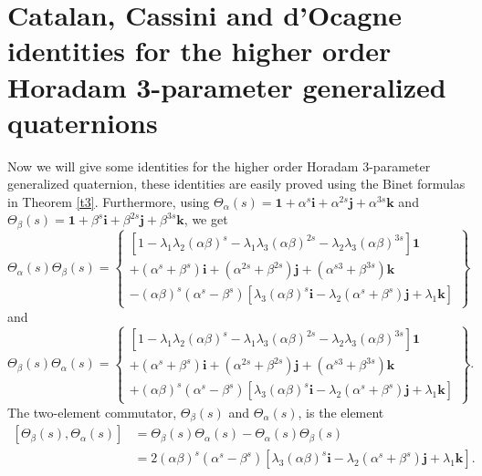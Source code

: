 \documentclass{kms-c}
\theoremstyle{plain}
\theoremstyle{definition}
\theoremstyle{remark}
\begin{document}
\section{Catalan, Cassini and d'Ocagne identities for the higher order Horadam 3-parameter generalized quaternions}
Now we will give some identities for the higher order Horadam 3-parameter generalized quaternion, these identities are easily proved using the Binet formulas in Theorem \ref{t3}. Furthermore, using $\Theta_{\alpha}(s)=\textbf{1}+\alpha^{s}\textbf{i}+\alpha^{2s}\textbf{j}+\alpha^{3s}\textbf{k}$ and $\Theta_{\beta}(s)=\textbf{1}+\beta^{s}\textbf{i}+\beta^{2s}\textbf{j}+\beta^{3s}\textbf{k}$, we get
\[
\Theta_{\alpha}(s)\Theta_{\beta}(s)=\left\lbrace \begin{array}{c}
\left[1-\lambda_{1}\lambda_{2}(\alpha\beta)^{s}-\lambda_{1}\lambda_{3}(\alpha\beta)^{2s}-\lambda_{2}\lambda_{3}(\alpha\beta)^{3s}\right]\textbf{1}\\
+(\alpha^{s}+\beta^{s})\textbf{i}+(\alpha^{2s}+\beta^{2s})\textbf{j}+(\alpha^{s3}+\beta^{3s})\textbf{k}\\
-(\alpha\beta)^{s}(\alpha^{s}-\beta^{s})\left[\lambda_{3}(\alpha\beta)^{s}\textbf{i}-\lambda_{2}(\alpha^{s}+\beta^{s})\textbf{j}+\lambda_{1}\textbf{k}\right]
\end{array}
\right\rbrace 
\]
and 
\[
\Theta_{\beta}(s)\Theta_{\alpha}(s)=\left\lbrace \begin{array}{c}
\left[1-\lambda_{1}\lambda_{2}(\alpha\beta)^{s}-\lambda_{1}\lambda_{3}(\alpha\beta)^{2s}-\lambda_{2}\lambda_{3}(\alpha\beta)^{3s}\right]\textbf{1}\\
+(\alpha^{s}+\beta^{s})\textbf{i}+(\alpha^{2s}+\beta^{2s})\textbf{j}+(\alpha^{s3}+\beta^{3s})\textbf{k}\\
+(\alpha\beta)^{s}(\alpha^{s}-\beta^{s})\left[\lambda_{3}(\alpha\beta)^{s}\textbf{i}-\lambda_{2}(\alpha^{s}+\beta^{s})\textbf{j}+\lambda_{1}\textbf{k}\right]
\end{array}
\right\rbrace .
\]
The two-element commutator, $\Theta_{\beta}(s)$ and $\Theta_{\alpha}(s)$, is the element
\begin{equation}\label{c}
\begin{aligned}
\left[\Theta_{\beta}(s),\Theta_{\alpha}(s)\right]&=\Theta_{\beta}(s)\Theta_{\alpha}(s)-\Theta_{\alpha}(s)\Theta_{\beta}(s)\\
&=2(\alpha\beta)^{s}(\alpha^{s}-\beta^{s})\left[\lambda_{3}(\alpha\beta)^{s}\textbf{i}-\lambda_{2}(\alpha^{s}+\beta^{s})\textbf{j}+\lambda_{1}\textbf{k}\right].
\end{aligned}
\end{equation}
\end{document}
